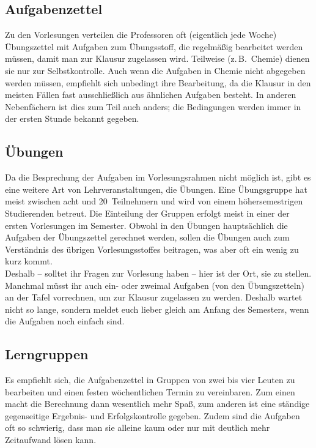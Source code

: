 \begin{multicols}{2}
\subsection*{Aufgabenzettel}
Zu den Vorlesungen verteilen die Professoren oft (eigentlich jede Woche) Übungszettel mit Aufgaben zum Übungsstoff, die regelmäßig bearbeitet werden müssen, damit man zur Klausur zugelassen wird. Teilweise (z.\,B.\ Chemie) dienen sie nur zur Selbstkontrolle. Auch wenn die Aufgaben in Chemie nicht abgegeben werden müssen, empfiehlt sich unbedingt ihre Bearbeitung, da die Klausur in den meisten Fällen fast ausschließlich aus ähnlichen Aufgaben besteht. In anderen Nebenfächern ist dies zum Teil auch anders; die Bedingungen werden immer in der ersten Stunde bekannt gegeben.

\subsection*{Übungen}
Da die Besprechung der Aufgaben im Vorlesungsrahmen nicht möglich ist, gibt es eine weitere Art von Lehrveranstaltungen, die Übungen. Eine Übungsgruppe hat meist zwischen acht und 20~Teilnehmern und wird von einem höhersemestrigen Studierenden betreut. Die Einteilung der Gruppen erfolgt meist in einer der ersten Vorlesungen im Semester. Obwohl in den Übungen hauptsächlich die Aufgaben der Übungszettel gerechnet werden, sollen die Übungen auch zum Verständnis des übrigen Vorlesungsstoffes beitragen, was aber oft ein wenig zu kurz kommt.\\
Deshalb -- solltet ihr Fragen zur Vorlesung haben -- hier ist der Ort, sie zu stellen. Manchmal müsst ihr auch ein- oder zweimal Aufgaben (von den Übungszetteln) an der Tafel vorrechnen, um zur Klausur zugelassen zu werden. Deshalb wartet nicht so lange, sondern meldet euch lieber gleich am Anfang des Semesters, wenn die Aufgaben noch einfach sind.

\subsection*{Lerngruppen}
Es empfiehlt sich, die Aufgabenzettel in Gruppen von zwei bis vier Leuten zu bearbeiten und einen festen wöchentlichen Termin zu vereinbaren. Zum einen macht die Berechnung dann wesentlich mehr Spaß, zum anderen ist eine ständige gegenseitige Ergebnis- und Erfolgskontrolle gegeben. Zudem sind die Aufgaben oft so schwierig, dass man sie alleine kaum oder nur mit deutlich mehr Zeitaufwand lösen kann.


\end{multicols}
